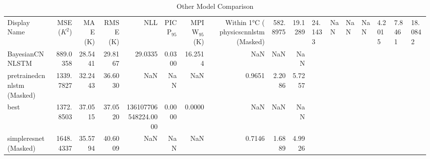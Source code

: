 \begin{table}
\caption{Other Model Comparison}
\begin{tabular}{lrrrrrrrrr}
\toprule
Display Name & MSE ($K^2$) & MAE (K) & RMSE (K) & NLL & PICP$_{95}$ & MPIW$_{95}$ (K) & Within 1°C (%
\midrule
physicscnnlstm (Masked) & 582.8975 & 19.1289 & 24.1433 & NaN & NaN & NaN & 4.2015 & 7.8461 & 18.0842 \\
BayesianCNNLSTM & 889.0358 & 28.5441 & 29.8167 & 29.0335 & 0.0300 & 16.2514 & NaN & NaN & NaN \\
pretrainedcnnlstm (Masked) & 1339.7827 & 32.2443 & 36.6030 & NaN & NaN & NaN & 0.9651 & 2.2086 & 5.7257 \\
best & 1372.8503 & 37.0515 & 37.0520 & 136107706548224.0000 & 0.0000 & 0.0000 & NaN & NaN & NaN \\
simpleresnet (Masked) & 1648.4337 & 35.5794 & 40.6009 & NaN & NaN & NaN & 0.7146 & 1.6889 & 4.9926 \\
\bottomrule
\end{tabular}
\end{table}
